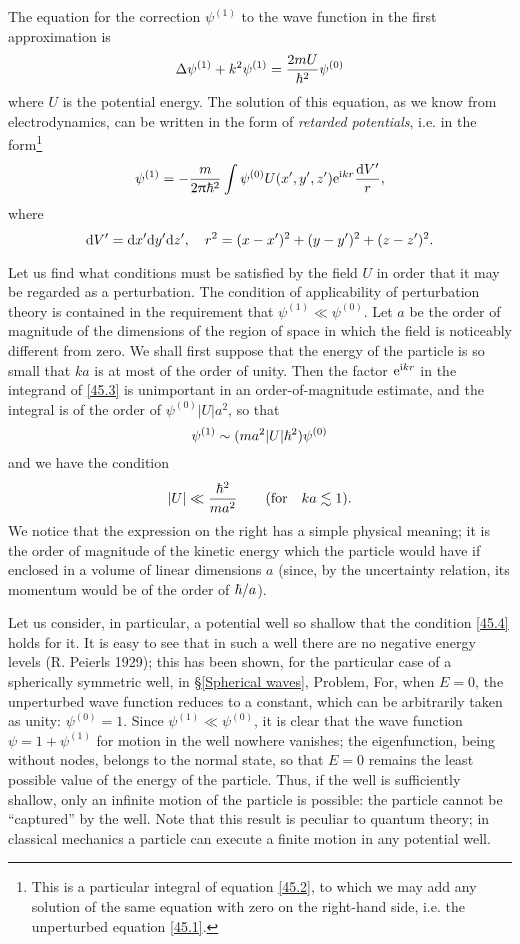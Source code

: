 The equation for the correction $ \psi^{(1)} $ to the wave function in the first approximation is
\begin{equation}\label{45.2}
\Delta\psi^{(1)}+k^2\psi^{(1)}=\frac{2mU}{\hbar^2}\psi^{(0)}
\end{equation}
where $ U $ is the potential energy. The solution of this equation, as we know from electrodynamics, can be written in the form of \textit{retarded potentials}, i.e. in the form\footnote{This is a particular integral of equation \eqref{45.2}, to which we may add any solution of the same equation with zero on the right-hand side, i.e. the unperturbed equation \eqref{45.1}.
}
\begin{equation}\label{45.3}
\psi^{(1)}=-\frac{m}{2\uppi\hbar^2}\int\psi^{(0)}U(x',y',z')\mathrm{e}^{\mathrm{i} kr}\frac{\mathrm{d} V'}{r},
\end{equation}
where
\[ \mathrm{d} V'=\mathrm{d} x'\mathrm{d} y'\mathrm{d} z',\quad r^2=(x-x')^2+(y-y')^2+(z-z')^2. \]



Let us find what conditions must be satisfied by the field $ U $ in order that it may be regarded as a perturbation. The condition of applicability of perturbation theory is contained in the requirement that $ \psi^{(1)}\ll \psi^{(0)} $. Let $ a $ be the order of magnitude of the dimensions of the region of space in which the field is noticeably different from zero. We shall first suppose that the energy of the particle is so small that $ ka $ is at most of the order of unity. Then the factor $ \mathrm{e}^{\mathrm{i} kr} $ in the integrand of \eqref{45.3} is unimportant in an order-of-magnitude estimate, and the integral is of the order of $ \psi^{(0)}|U|a^2 $, so that
\[ \psi^{(1)}\sim(ma^2|U|\hbar^2)\psi^{(0)} \]
and we have the condition
\begin{equation}\label{45.4}
|U|\ll\frac{\hbar^2}{ma^2}\qquad(\mathrm{for}\quad ka\lesssim1).
\end{equation}
We notice that the expression on the right has a simple physical meaning; it is the order of magnitude of the kinetic energy which the particle would have if enclosed in a volume of linear dimensions $ a $ (since, by the uncertainty relation, its momentum would be of the order of $ \hbar/a $).

Let us consider, in particular, a potential well so shallow that the condition \eqref{45.4} holds for it. It is easy to see that in such a well there are no negative energy levels (R. Peierls 1929); this has been shown, for the particular case of a spherically symmetric well, in \S\ref{Spherical waves}, Problem, For, when $ E = 0 $, the unperturbed wave function reduces to a constant, which can be arbitrarily taken as unity: $ \psi^{(0)} = 1 $. Since $ \psi^{(1)}\ll \psi^{(0)} $, it is clear that the wave function $ \psi = 1+\psi^{(1)} $ for motion in the well nowhere vanishes; the eigenfunction, being without nodes, belongs to the normal state, so that $ E = 0 $ remains the least possible value of the energy of the particle. Thus, if the well is sufficiently shallow, only an infinite motion of the particle is possible: the particle cannot be “captured” by the well. Note that this result is peculiar to quantum theory; in classical mechanics a particle can execute a finite motion in any potential well.

